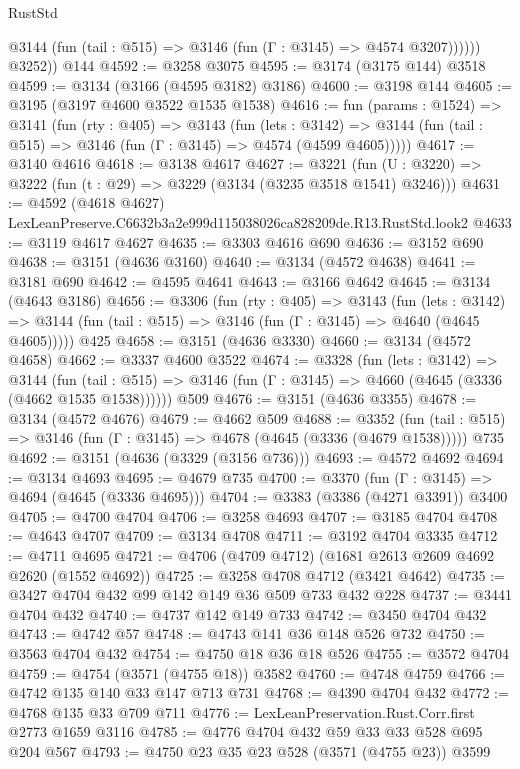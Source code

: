 \begin{lexlean}{RustStd}
\begin{coremodule}
              @3144 (fun (tail : @515) => @3146 (fun (Γ : @3145) => @4574 @3207))))))
        @3252))
    @144
@4592 := @3258 @3075
@4595 := @3174 (@3175 @144) @3518
@4599 := @3134 (@3166 (@4595 @3182) @3186)
@4600 := @3198 @144
@4605 := @3195 (@3197 @4600 @3522 @1535 @1538)
@4616 := fun (params : @1524) =>
  @3141
    (fun (rty : @405) =>
    @3143
      (fun (lets : @3142) =>
      @3144 (fun (tail : @515) => @3146 (fun (Γ : @3145) => @4574 (@4599 @4605)))))
@4617 := @3140 @4616
@4618 := @3138 @4617
@4627 := @3221 (fun (U : @3220) => @3222 (fun (t : @29) => @3229 (@3134 (@3235 @3518 @1541) @3246)))
@4631 := @4592 (@4618 @4627) LexLeanPreserve.C6632b3a2e999d115038026ca828209de.R13.RustStd.look2
@4633 := @3119 @4617 @4627
@4635 := @3303 @4616 @690
@4636 := @3152 @690
@4638 := @3151 (@4636 @3160)
@4640 := @3134 (@4572 @4638)
@4641 := @3181 @690
@4642 := @4595 @4641
@4643 := @3166 @4642
@4645 := @3134 (@4643 @3186)
@4656 := @3306
    (fun (rty : @405) =>
    @3143
      (fun (lets : @3142) =>
      @3144 (fun (tail : @515) => @3146 (fun (Γ : @3145) => @4640 (@4645 @4605)))))
    @425
@4658 := @3151 (@4636 @3330)
@4660 := @3134 (@4572 @4658)
@4662 := @3337 @4600 @3522
@4674 := @3328
    (fun (lets : @3142) =>
    @3144
      (fun (tail : @515) => @3146 (fun (Γ : @3145) => @4660 (@4645 (@3336 (@4662 @1535 @1538))))))
    @509
@4676 := @3151 (@4636 @3355)
@4678 := @3134 (@4572 @4676)
@4679 := @4662 @509
@4688 := @3352
    (fun (tail : @515) => @3146 (fun (Γ : @3145) => @4678 (@4645 (@3336 (@4679 @1538)))))
    @735
@4692 := @3151 (@4636 (@3329 (@3156 @736)))
@4693 := @4572 @4692
@4694 := @3134 @4693
@4695 := @4679 @735
@4700 := @3370 (fun (Γ : @3145) => @4694 (@4645 (@3336 @4695)))
@4704 := @3383 (@3386 (@4271 @3391)) @3400
@4705 := @4700 @4704
@4706 := @3258 @4693
@4707 := @3185 @4704
@4708 := @4643 @4707
@4709 := @3134 @4708
@4711 := @3192 @4704 @3335
@4712 := @4711 @4695
@4721 := @4706 (@4709 @4712) (@1681 @2613 @2609 @4692 @2620 (@1552 @4692))
@4725 := @3258 @4708 @4712 (@3421 @4642)
@4735 := @3427 @4704 @432 @99 @142 @149 @36 @509 @733 @432 @228
@4737 := @3441 @4704 @432
@4740 := @4737 @142 @149 @733
@4742 := @3450 @4704 @432
@4743 := @4742 @57
@4748 := @4743 @141 @36 @148 @526 @732
@4750 := @3563 @4704 @432
@4754 := @4750 @18 @36 @18 @526
@4755 := @3572 @4704
@4759 := @4754 (@3571 (@4755 @18)) @3582
@4760 := @4748 @4759
@4766 := @4742 @135 @140 @33 @147 @713 @731
@4768 := @4390 @4704 @432
@4772 := @4768 @135 @33 @709 @711
@4776 := LexLeanPreservation.Rust.Corr.first @2773 @1659 @3116
@4785 := @4776 @4704 @432 @59 @33 @33 @528 @695 @204 @567
@4793 := @4750 @23 @35 @23 @528 (@3571 (@4755 @23)) @3599

\end{coremodule}
\end{lexlean}
